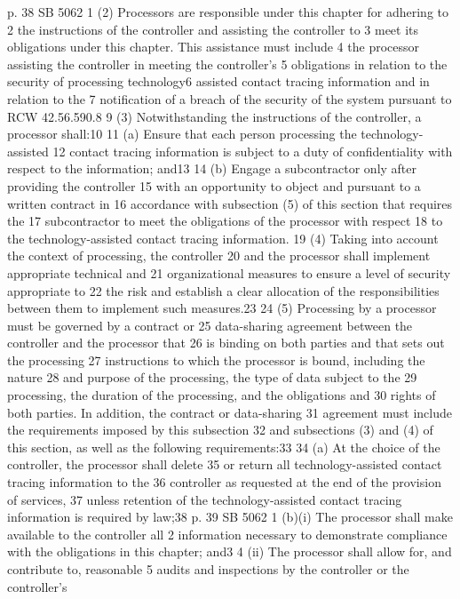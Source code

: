 p. 38 SB 5062
1 (2) Processors are responsible under this chapter for adhering to
2 the instructions of the controller and assisting the controller to
3 meet its obligations under this chapter. This assistance must include
4 the processor assisting the controller in meeting the controller's
5 obligations in relation to the security of processing technology6 assisted contact tracing information and in relation to the
7 notification of a breach of the security of the system pursuant to
RCW 42.56.590.8
9 (3) Notwithstanding the instructions of the controller, a
processor shall:10
11 (a) Ensure that each person processing the technology-assisted
12 contact tracing information is subject to a duty of confidentiality
with respect to the information; and13
14 (b) Engage a subcontractor only after providing the controller
15 with an opportunity to object and pursuant to a written contract in
16 accordance with subsection (5) of this section that requires the
17 subcontractor to meet the obligations of the processor with respect
18 to the technology-assisted contact tracing information.
19 (4) Taking into account the context of processing, the controller
20 and the processor shall implement appropriate technical and
21 organizational measures to ensure a level of security appropriate to
22 the risk and establish a clear allocation of the responsibilities
between them to implement such measures.23
24 (5) Processing by a processor must be governed by a contract or
25 data-sharing agreement between the controller and the processor that
26 is binding on both parties and that sets out the processing
27 instructions to which the processor is bound, including the nature
28 and purpose of the processing, the type of data subject to the
29 processing, the duration of the processing, and the obligations and
30 rights of both parties. In addition, the contract or data-sharing
31 agreement must include the requirements imposed by this subsection
32 and subsections (3) and (4) of this section, as well as the following
requirements:33
34 (a) At the choice of the controller, the processor shall delete
35 or return all technology-assisted contact tracing information to the
36 controller as requested at the end of the provision of services,
37 unless retention of the technology-assisted contact tracing
information is required by law;38
p. 39 SB 5062
1 (b)(i) The processor shall make available to the controller all
2 information necessary to demonstrate compliance with the obligations
in this chapter; and3
4 (ii) The processor shall allow for, and contribute to, reasonable
5 audits and inspections by the controller or the controller's
